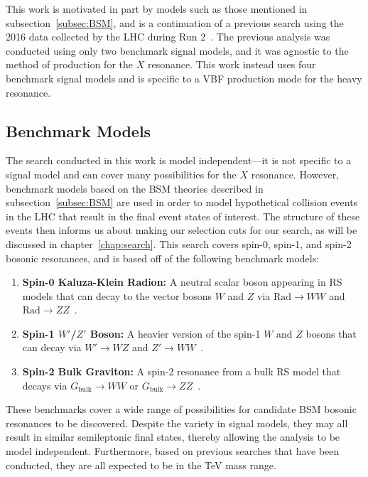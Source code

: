 This work is motivated in part by models such as those mentioned in subsection~\ref{subsec:BSM}, and is a continuation of a previous search using the 2016 data collected by the LHC during Run 2~\cite{Sirunyan_2018}.
The previous analysis was conducted using only two benchmark signal models, and it was agnostic to the method of production for the $X$ resonance.
This work instead uses four benchmark signal models and is specific to a VBF production mode for the heavy resonance.

\subsection{Benchmark Models}

The search conducted in this work is model independent---it is not specific to a signal model and can cover many possibilities for the $X$ resonance.
However, benchmark models based on the BSM theories described in subsection~\ref{subsec:BSM} are used in order to model hypothetical collision events in the LHC that result in the final event states of interest.
The structure of these events then informs us about making our selection cuts for our search, as will be discussed in chapter~\ref{chap:search}.
This search covers spin-0, spin-1, and spin-2 bosonic resonances, and is based off of the following benchmark models:
\begin{enumerate}
  \item \textbf{Spin-0 Kaluza-Klein Radion:} A neutral scalar boson appearing in RS models that can decay to the vector bosons $W$ and $Z$ via $\mathrm{Rad}\to WW$ and $\mathrm{Rad}\to ZZ$~\cite{Goldberger_1999,Goldberger_2000}.
  \item \textbf{Spin-1 $W'$/$Z'$ Boson:} A heavier version of the spin-1 $W$ and $Z$ bosons that can decay via $W'\to WZ$ and $Z'\to WW$~\cite{Pappadopulo_2014}.
  \item \textbf{Spin-2 Bulk Graviton:} A spin-2 resonance from a bulk RS model that decays via $G_\mathrm{bulk}\to WW$ or $G_\mathrm{bulk}\to ZZ$~\cite{Fitzpatrick_2007,PhysRevD.76.036006}.
\end{enumerate}

These benchmarks cover a wide range of possibilities for candidate BSM bosonic resonances to be discovered.
Despite the variety in signal models, they may all result in similar semileptonic final states, thereby allowing the analysis to be model independent.
Furthermore, based on previous searches that have been conducted, they are all expected to be in the TeV mass range. %

